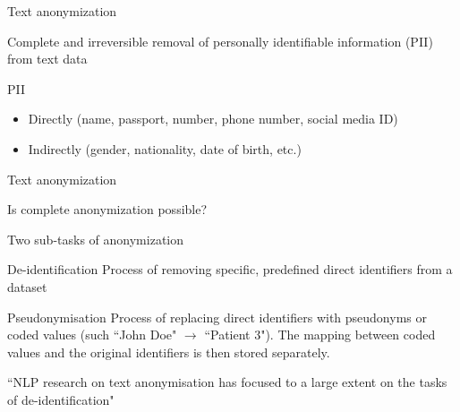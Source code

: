 \documentclass[12pt,aspectratio=169,handout]{beamer}
\begin{document}
\begin{frame}{Text anonymization}

Complete and irreversible removal of personally identifiable information (PII) from text data

\begin{block}{PII}
\begin{itemize}
\item Directly (name, passport, number, phone number, social media ID)
\item Indirectly (gender, nationality, date of birth, etc.)
\end{itemize}
\end{block}

	
\end{frame}


\begin{frame}{Text anonymization}

Is complete anonymization possible?

	
\end{frame}




\begin{frame}{Two sub-tasks of anonymization}

\begin{block}{De-identification}
Process of removing specific, predefined direct identifiers from a dataset
\end{block}

\begin{block}{Pseudonymisation}
Process of replacing direct identifiers with pseudonyms or coded values (such ``John Doe" $\rightarrow$ ``Patient 3"). The mapping between coded values and the original identifiers is then stored separately.
\end{block}


``NLP research on text anonymisation has focused to a large extent on the tasks of de-identification" \citep[p.~4190]{Lison.et.al.2021.ACL}

\end{frame}
\end{document}
